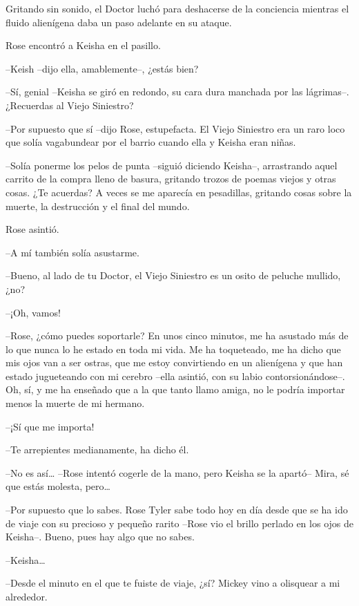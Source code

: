 {Gritando sin sonido, el Doctor luchó para deshacerse de la conciencia
mientras el fluido alienígena daba un paso adelante en su ataque.}

\mbox{}

{Rose encontró a Keisha en el pasillo.}

{--Keish --dijo ella, amablemente--, ¿estás bien?}

{--Sí, genial --Keisha se giró en redondo, su cara dura manchada por las
lágrimas--. ¿Recuerdas al Viejo Siniestro?}

{--Por supuesto que sí --dijo Rose, estupefacta. El Viejo Siniestro era
 un raro loco que solía vagabundear por el barrio cuando ella y Keisha
eran niñas.}

{--Solía ponerme los pelos de punta --siguió diciendo Keisha--,
 arrastrando aquel carrito de la compra lleno de basura, gritando trozos
 de poemas viejos y otras cosas. ¿Te acuerdas? A veces se me aparecía en
 pesadillas, gritando cosas sobre la muerte, la destrucción y el final
del mundo.}

{Rose asintió.}

{--A mí también solía asustarme.}

{--Bueno, al lado de tu Doctor, el Viejo Siniestro es un osito de
peluche mullido, ¿no?}

{--¡Oh, vamos!}

{--Rose, ¿cómo puedes soportarle? En unos cinco minutos, me ha asustado
 más de lo que nunca lo he estado en toda mi vida. Me ha toqueteado, me
 ha dicho que mis ojos van a ser ostras, que me estoy convirtiendo en un
 alienígena y que han estado jugueteando con mi cerebro --ella asintió,
 con su labio contorsionándose--. Oh, sí, y me ha enseñado que a la que
tanto llamo amiga, no le podría importar menos la muerte de mi hermano.}

{--¡Sí que me importa!}

{--Te arrepientes medianamente, ha dicho él.}

{--No es así\ldots{} --Rose intentó cogerle de la mano, pero Keisha se
 la apartó-- Mira, sé que estás molesta, pero\ldots{}}

{--Por supuesto que lo sabes. Rose Tyler sabe todo hoy en día desde que
 se ha ido de viaje con su precioso y pequeño rarito --Rose vio el brillo
perlado en los ojos de Keisha--. Bueno, pues hay algo que no sabes.}

{--Keisha\ldots{}}

{--Desde el minuto en el que te fuiste de viaje, ¿sí? Mickey vino a
olisquear a mi alrededor.}


